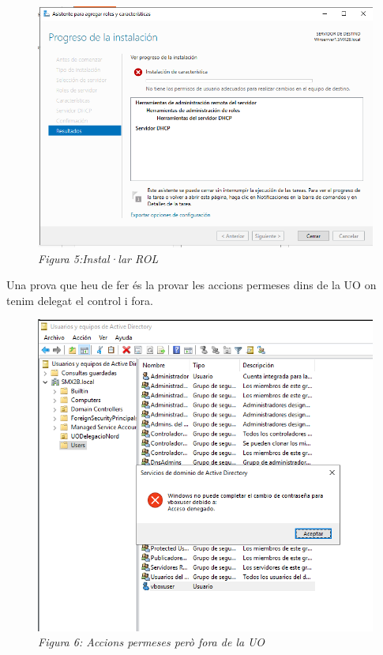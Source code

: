 \documentclass[
  a4paper,
]{article}
\begin{document}
\begin{figure}
\centering
\includegraphics{png/InstalarRolNO.png}
\caption{\emph{Figura 5:Instal·lar ROL}}
\end{figure}

Una prova que heu de fer és la provar les accions permeses dins de la UO
on tenim delegat el control i fora.

\begin{figure}
\centering
\includegraphics{png/NoTienePrivilegios.png}
\caption{\emph{Figura 6: Accions permeses però fora de la UO}}
\end{figure}
\end{document}

